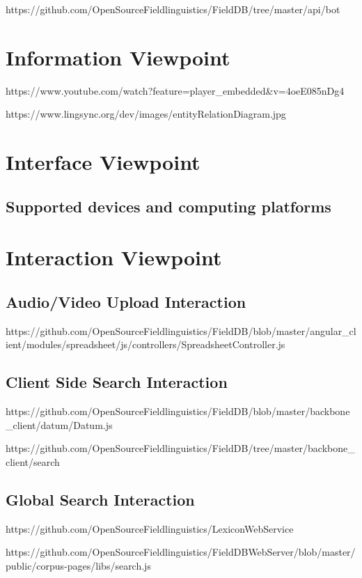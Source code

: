 \documentclass[12pt]{article}
\begin{document}
https://github.com/OpenSourceFieldlinguistics/FieldDB/tree/master/api/bot

\section{Information Viewpoint}

https://www.youtube.com/watch?feature=player_embedded\&v=4oeE085nDg4


https://www.lingsync.org/dev/images/entityRelationDiagram.jpg


\section{Interface Viewpoint}

\subsection{Supported devices and computing platforms}

\section{Interaction Viewpoint}
\subsection{Audio/Video Upload Interaction}

https://github.com/OpenSourceFieldlinguistics/FieldDB/blob/master/angular_client/modules/spreadsheet/js/controllers/SpreadsheetController.js


\subsection{Client Side Search Interaction}

https://github.com/OpenSourceFieldlinguistics/FieldDB/blob/master/backbone_client/datum/Datum.js

https://github.com/OpenSourceFieldlinguistics/FieldDB/tree/master/backbone_client/search

\subsection{Global Search Interaction}

https://github.com/OpenSourceFieldlinguistics/LexiconWebService

https://github.com/OpenSourceFieldlinguistics/FieldDBWebServer/blob/master/public/corpus-pages/libs/search.js
\end{document}
